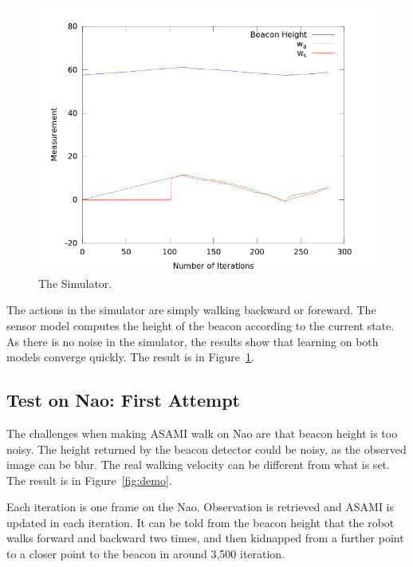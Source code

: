 \documentclass[10pt]{IEEEtran}
\begin{document}
\begin{figure}[h]
\centering
\includegraphics[width=\columnwidth]{simResult.png}
\caption{The Simulator.}
\label{fig:sim}
\end{figure}

The actions in the simulator are simply walking backward or foreward.
The sensor model computes the height of the beacon according to the
current state. As there is no noise in the simulator, the results show
that learning on both models converge quickly. The result is in
Figure~\ref{fig:sim}.

\subsection{Test on Nao: First Attempt}

The challenges when making ASAMI walk on Nao are that beacon height is
too noisy. The height returned by the beacon detector could be noisy,
as the observed image can be blur. The real walking velocity can be
different from what is set. The result is in Figure~\ref{fig:demo}.

Each iteration is one frame on the Nao. Observation is retrieved and
ASAMI is updated in each iteration. It can be told from the beacon
height that the robot walks forward and backward two times, and then
kidnapped from a further point to a closer point to the beacon in
around 3,500 iteration.
\end{document}

